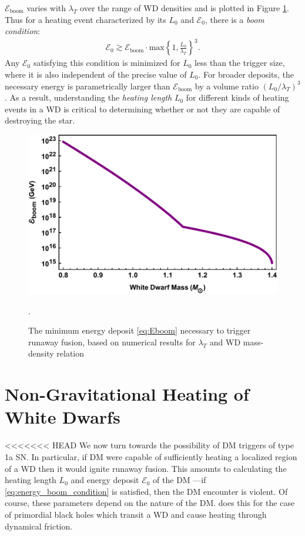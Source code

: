 \documentclass[twocolumn, preprintnumbers,amsmath,amssymb,prd, superscriptaddress]{revtex4}
\newcommand{\Ez}{\mathcal{E}_0}
\newcommand{\Eboom}{\mathcal{E}_\text{boom}}
\begin{document}
$\Eboom$ varies with $\lambda_T$ over the range of WD densities and is plotted in Figure \ref{fig:Eboom}. 
Thus for a heating event characterized by its $L_0$ and $\Ez$, there is a \emph{boom condition}:
\begin{align}
    \label{eq:energy_boom_condition}
    \Ez \gtrsim
    \Eboom \cdot \text{max}\left\{1, \frac{L_0}{\lambda_T}\right\}^3.
\end{align}
Any $\Ez$ satisfying this condition is minimized for $L_0$ less than the trigger size, where it is also independent of the precise value of $L_0$.
For broader deposits, the necessary energy is parametrically larger than $\Eboom$ by a volume ratio $(L_0/\lambda_T)^3$.
As a result, understanding the \emph{heating length} $L_0$ for different kinds of heating events in a WD is critical to determining whether or not they are capable of destroying the star.
\begin{figure}
\includegraphics[scale=.45]{Eboom.pdf}
\caption{The minimum energy deposit \eqref{eq:Eboom} necessary to trigger runaway fusion, based on numerical results for $\lambda_T$ \cite{Woosley} and WD mass-density relation \cite{cococubed}}.
\label{fig:Eboom}
\end{figure}

\section{Non-Gravitational Heating of White Dwarfs}
\label{sec:SMHeating}

<<<<<<< HEAD
We now turn towards the possibility of DM triggers of type 1a SN. 
In particular, if DM were capable of sufficiently heating a localized region of a WD then it would ignite runaway fusion.
This amounts to calculating the heating length $L_0$ and energy deposit $\Ez$ of the DM ---if \eqref{eq:energy_boom_condition} is satisfied, then the DM encounter is violent. 
Of course, these parameters depend on the nature of the DM.
\cite{Graham:2015apa} does this for the case of primordial black holes which transit a WD and cause heating through dynamical friction.
\end{document}
